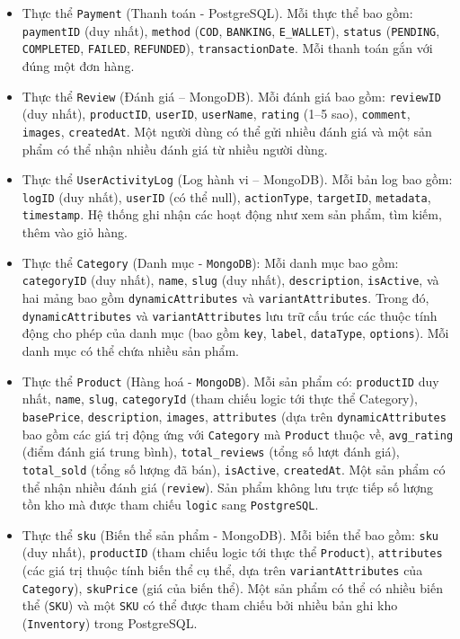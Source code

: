 \begin{itemize}[label=$\circ$]
    \item Thực thể \texttt{Payment} (Thanh toán - PostgreSQL). Mỗi thực thể bao gồm: 
    \texttt{paymentID} (duy nhất), \texttt{method} (\texttt{COD}, \texttt{BANKING}, \texttt{E\_WALLET}), \texttt{status} (\texttt{PENDING}, \texttt{COMPLETED}, \texttt{FAILED}, \texttt{REFUNDED}), \texttt{transactionDate}. 
    Mỗi thanh toán gắn với đúng một đơn hàng.

    \item Thực thể \texttt{Review} (Đánh giá – MongoDB). Mỗi đánh giá bao gồm:
    \texttt{reviewID} (duy nhất), \texttt{productID}, \texttt{userID}, \texttt{userName}, \texttt{rating} (1--5 sao), \texttt{comment}, \texttt{images}, \texttt{createdAt}. 
    Một người dùng có thể gửi nhiều đánh giá và một sản phẩm có thể nhận nhiều đánh giá từ nhiều người dùng.

    \item Thực thể \texttt{UserActivityLog} (Log hành vi – MongoDB). Mỗi bản log bao gồm: 
    \texttt{logID} (duy nhất), \texttt{userID} (có thể null), \texttt{actionType}, \texttt{targetID}, \texttt{metadata}, \texttt{timestamp}. 
    Hệ thống ghi nhận các hoạt động như xem sản phẩm, tìm kiếm, thêm vào giỏ hàng.

    \item Thực thể \texttt{Category} (Danh mục - \texttt{MongoDB}): Mỗi danh mục bao gồm: \texttt{categoryID} (duy nhất), \texttt{name}, \texttt{slug} (duy nhất), \texttt{description}, \texttt{isActive}, và hai mảng bao gồm \texttt{dynamicAttributes} và \texttt{variantAttributes}. Trong đó, \texttt{dynamicAttributes} và \texttt{variantAttributes} lưu trữ cấu trúc các thuộc tính động cho phép của danh mục (bao gồm \texttt{key}, \texttt{label}, \texttt{dataType}, \texttt{options}). Mỗi danh mục có thể chứa nhiều sản phẩm.

    \item Thực thể \texttt{Product} (Hàng hoá - \texttt{MongoDB}). Mỗi sản phẩm có: \texttt{productID} duy nhất, \texttt{name}, \texttt{slug}, \texttt{categoryId} (tham chiếu logic tới thực thể Category), \texttt{basePrice}, \texttt{description}, \texttt{images}, \texttt{attributes} (dựa trên \texttt{dynamicAttributes} bao gồm các giá trị động ứng với \texttt{Category} mà \texttt{Product} thuộc về, \texttt{avg\_rating} (điểm đánh giá trung bình), \texttt{total\_reviews} (tổng số lượt đánh giá), \texttt{total\_sold} (tổng số lượng đã bán), \texttt{isActive}, \texttt{createdAt}. Một sản phẩm có thể nhận nhiều đánh giá (\texttt{review}). Sản phẩm không lưu trực tiếp số lượng tồn kho mà được tham chiếu \texttt{logic} sang \texttt{PostgreSQL}.

    \item Thực thể \texttt{sku} (Biến thể sản phẩm - MongoDB). Mỗi biến thể bao gồm: \texttt{sku} (duy nhất), \texttt{productID} (tham chiếu logic tới thực thể \texttt{Product}), \texttt{attributes} (các giá trị thuộc tính biến thể cụ thể, dựa trên \texttt{variantAttributes} của \texttt{Category}), \texttt{skuPrice} (giá của biến thể). Một sản phẩm có thể có nhiều biến thể (\texttt{SKU}) và một \texttt{SKU} có thể được tham chiếu bởi nhiều bản ghi kho (\texttt{Inventory}) trong PostgreSQL.
\end{itemize}

